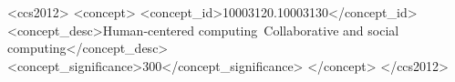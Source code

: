 \documentclass[format=acmsmall, review=false, screen=true, anonymous=true, table]{acmart}
\begin{document}
\begin{comment}
Q\&A sites are emerging as a knowledge sharing and acquisition platform for different users, but most of them run in only one language (mostly English).
As not everyone can ask or answer questions in English, many Q\&A sites now begin to release their multi-lingual variants to serve users who speak other languages.
For example, in addition to the main English Stack Overflow, we now have Russian, Portuguese, Spanish and Japanese Stack Overflow.
The launch of such multi-lingual sites always leads to intense dispute about the pros and cons of multi-lingual sites.
Although all arguments and concerns sound reasonable, people can rarely provide solid evidence of their arguments and concerns to convince each other.
In this paper, from the users' comments about the launch of several non-English Stack Overflow sites, we first identify three major concerns including community split, knowledge needs and interests in other languages, and knowledge fragmentation and duplication.
We then conduct an evidence-based data analysis and comparison of user characteristics, tag usage and cross-site links between the Russian Stack Overflow and the English Stack Overflow on these three concerns.
Our results show that some special knowledge needs and interests in non-English languages warrant the value of multi-lingual Q\&A sites, and multi-lingual Q\&A sites do not result in community split.
However, knowledge fragmentation and duplication across multi-lingual sites is a valid concern.
Although manual cross-site linking can partially deal with this issue, the extent of knowledge fragmentation and duplication calls for automated cross-site linking and cross-site translation support.
\end{comment}

\begin{CCSXML}
	<ccs2012>
	<concept>
	<concept_id>10003120.10003130</concept_id>
	<concept_desc>Human-centered computing~Collaborative and social computing</concept_desc>
	<concept_significance>300</concept_significance>
	</concept>
	</ccs2012>
\end{CCSXML}



%
%


\end{document}
